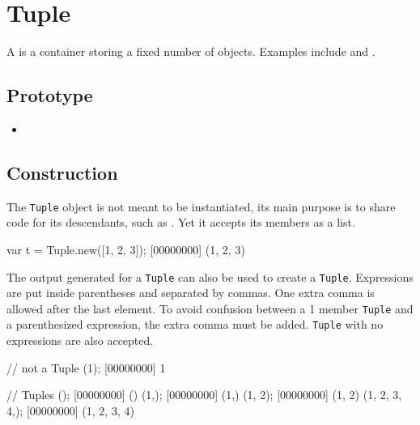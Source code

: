 
\section{Tuple}

A  is a container storing a fixed number of objects.
Examples include  and .

\subsection{Prototype}
\begin{itemize}
\item {}
\end{itemize}

\subsection{Construction}

The \lstinline|Tuple| object is not meant to be instantiated, its main
purpose is to share code for its descendants, such as .
Yet it accepts its members as a list.

\begin{urbiscript}[firstnumber=1]
var t = Tuple.new([1, 2, 3]);
[00000000] (1, 2, 3)
\end{urbiscript}

The output generated for a \lstinline|Tuple| can also be used to create a
\lstinline|Tuple|.  Expressions are put inside parentheses and separated by
commas.  One extra comma is allowed after the last element.  To avoid
confusion between a 1 member \lstinline|Tuple| and a parenthesized
expression, the extra comma must be added.  \lstinline|Tuple| with no
expressions are also accepted.

\begin{urbiscript}
// not a Tuple
(1);
[00000000] 1

// Tuples
();
[00000000] ()
(1,);
[00000000] (1,)
(1, 2);
[00000000] (1, 2)
(1, 2, 3, 4,);
[00000000] (1, 2, 3, 4)
\end{urbiscript}


